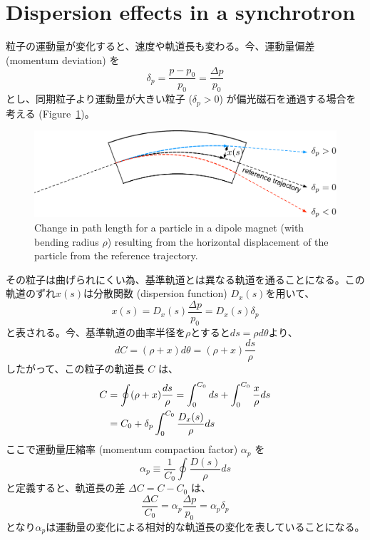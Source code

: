 \documentclass[10pt,a4paper]{ltjsarticle}
\begin{document}
\section{Dispersion effects in a synchrotron}
粒子の運動量が変化すると、速度や軌道長も変わる。今、運動量偏差 (momentum deviation) を
%
\begin{equation}
    \delta_p = \frac{p-p_0}{p_0}=\frac{\Delta p}{p_0}
\end{equation}
%
とし、同期粒子より運動量が大きい粒子 ($\delta_p >0$) が偏光磁石を通過する場合を考える (Figure~\ref{dispersion})。
%
\begin{figure}[hbt]
    \begin{center}
      \includegraphics[width=15cm,clip]{dispersion.pdf}
      \caption{Change in path length for a particle in a dipole magnet (with bending radius $\rho$) resulting from the horizontal displacement of the particle from the reference trajectory.}
      \label{dispersion}
    \end{center}
\end{figure}
%
その粒子は曲げられにくい為、基準軌道とは異なる軌道を通ることになる。この軌道のずれ$x(s)$は分散関数 (dispersion function) $D_x(s)$を用いて、
%
\begin{equation}
    x(s) = D_x(s)\frac{\Delta p}{p_0} = D_x(s)\delta_p 
\end{equation}
%
と表される。今、基準軌道の曲率半径を$\rho$とすると$ds = \rho d\theta$より、
%
\begin{equation}
    dC = (\rho + x) d\theta = (\rho + x) \frac{ds}{\rho}
\end{equation}
%
したがって、この粒子の軌道長 $C$ は、
%
\begin{align}
    C &= \oint (\rho + x)\frac{ds}{\rho} = \int_0^{C_0} ds + \int_0^{C_0}\frac{x}{\rho} ds \notag \\
    &= C_0 + \delta_p \int_0^{C_0}\frac{D_x(s)}{\rho} ds
\end{align}
%
ここで運動量圧縮率 (momentum compaction factor) $\alpha_p$ を
%
\begin{equation}
    \alpha_p \equiv \frac{1}{C_0} \oint \frac{D(s)}{\rho} ds
\end{equation}
%
と定義すると、軌道長の差 $\Delta C = C-C_0$ は、
%
\begin{equation}
    \frac{\Delta C}{C_0}=\alpha_p\frac{\Delta p}{p_0}=\alpha_p\delta_p
    \label{delta_C}
\end{equation}
%
となり$\alpha_p$は運動量の変化による相対的な軌道長の変化を表していることになる。
\end{document}
